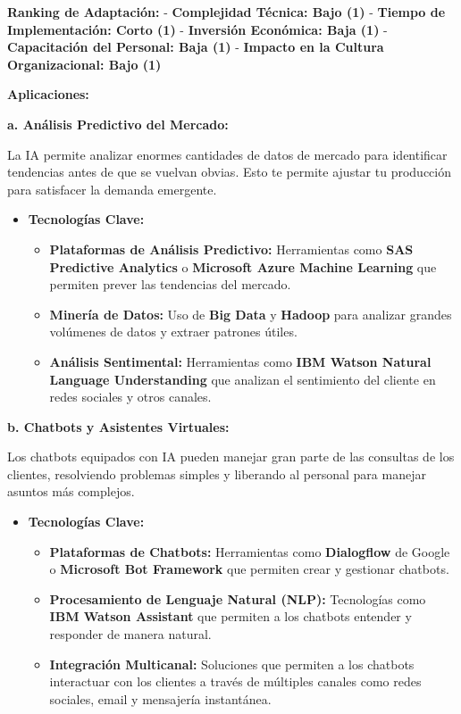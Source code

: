 \documentclass[
  10pt,
  letterpaper,
]{book}
\providecommand{\tightlist}{%
  \setlength{\itemsep}{0pt}\setlength{\parskip}{0pt}}\usepackage{longtable,booktabs,array}
\begin{document}
\textbf{Ranking de Adaptación:} - \textbf{Complejidad Técnica: Bajo (1)}
- \textbf{Tiempo de Implementación: Corto (1)} - \textbf{Inversión
Económica: Baja (1)} - \textbf{Capacitación del Personal: Baja (1)} -
\textbf{Impacto en la Cultura Organizacional: Bajo (1)}

\textbf{Aplicaciones:}

\textbf{a. Análisis Predictivo del Mercado:}

La IA permite analizar enormes cantidades de datos de mercado para
identificar tendencias antes de que se vuelvan obvias. Esto te permite
ajustar tu producción para satisfacer la demanda emergente.

\begin{itemize}
\tightlist
\item
  \textbf{Tecnologías Clave:}

  \begin{itemize}
  \tightlist
  \item
    \textbf{Plataformas de Análisis Predictivo:} Herramientas como
    \textbf{SAS Predictive Analytics} o \textbf{Microsoft Azure Machine
    Learning} que permiten prever las tendencias del mercado.
  \item
    \textbf{Minería de Datos:} Uso de \textbf{Big Data} y
    \textbf{Hadoop} para analizar grandes volúmenes de datos y extraer
    patrones útiles.
  \item
    \textbf{Análisis Sentimental:} Herramientas como \textbf{IBM Watson
    Natural Language Understanding} que analizan el sentimiento del
    cliente en redes sociales y otros canales.
  \end{itemize}
\end{itemize}

\textbf{b. Chatbots y Asistentes Virtuales:}

Los chatbots equipados con IA pueden manejar gran parte de las consultas
de los clientes, resolviendo problemas simples y liberando al personal
para manejar asuntos más complejos.

\begin{itemize}
\tightlist
\item
  \textbf{Tecnologías Clave:}

  \begin{itemize}
  \tightlist
  \item
    \textbf{Plataformas de Chatbots:} Herramientas como
    \textbf{Dialogflow} de Google o \textbf{Microsoft Bot Framework} que
    permiten crear y gestionar chatbots.
  \item
    \textbf{Procesamiento de Lenguaje Natural (NLP):} Tecnologías como
    \textbf{IBM Watson Assistant} que permiten a los chatbots entender y
    responder de manera natural.
  \item
    \textbf{Integración Multicanal:} Soluciones que permiten a los
    chatbots interactuar con los clientes a través de múltiples canales
    como redes sociales, email y mensajería instantánea.
  \end{itemize}
\end{itemize}
\end{document}
